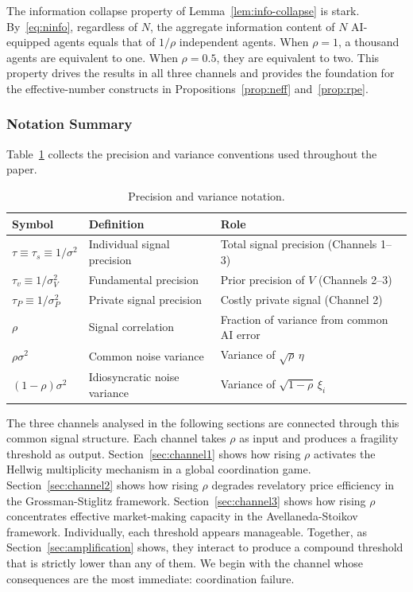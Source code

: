 The information collapse property of Lemma~\ref{lem:info-collapse} is stark. By~\eqref{eq:ninfo}, regardless of $N$, the aggregate information content of $N$ AI-equipped agents equals that of $1/\rho$ independent agents. When $\rho = 1$, a thousand agents are equivalent to one. When $\rho = 0.5$, they are equivalent to two. This property drives the results in all three channels and provides the foundation for the effective-number constructs in Propositions~\ref{prop:neff} and~\ref{prop:rpe}.

\subsubsection*{Notation Summary}

Table~\ref{tab:notation} collects the precision and variance conventions used throughout the paper.

\begin{table}[t]
\caption{Precision and variance notation.\label{tab:notation}}
\centering
\begin{tabular}{lll}
\hline
Symbol & Definition & Role \\
\hline
$\tau \equiv \tau_s \equiv 1/\sigma^2$ & Individual signal precision & Total signal precision (Channels 1--3) \\
$\tau_v \equiv 1/\sigma_V^2$ & Fundamental precision & Prior precision of $V$ (Channels 2--3) \\
$\tau_P \equiv 1/\sigma_P^2$ & Private signal precision & Costly private signal (Channel 2) \\
$\rho$ & Signal correlation & Fraction of variance from common AI error \\
$\rho\sigma^2$ & Common noise variance & Variance of $\sqrt{\rho}\,\eta$ \\
$(1-\rho)\sigma^2$ & Idiosyncratic noise variance & Variance of $\sqrt{1-\rho}\,\xi_i$ \\
\hline
\end{tabular}
\end{table}

The three channels analysed in the following sections are connected through this common signal structure. Each channel takes $\rho$ as input and produces a fragility threshold as output. Section~\ref{sec:channel1} shows how rising $\rho$ activates the Hellwig multiplicity mechanism in a global coordination game. Section~\ref{sec:channel2} shows how rising $\rho$ degrades revelatory price efficiency in the Grossman-Stiglitz framework. Section~\ref{sec:channel3} shows how rising $\rho$ concentrates effective market-making capacity in the Avellaneda-Stoikov framework. Individually, each threshold appears manageable. Together, as Section~\ref{sec:amplification} shows, they interact to produce a compound threshold that is strictly lower than any of them. We begin with the channel whose consequences are the most immediate: coordination failure.
